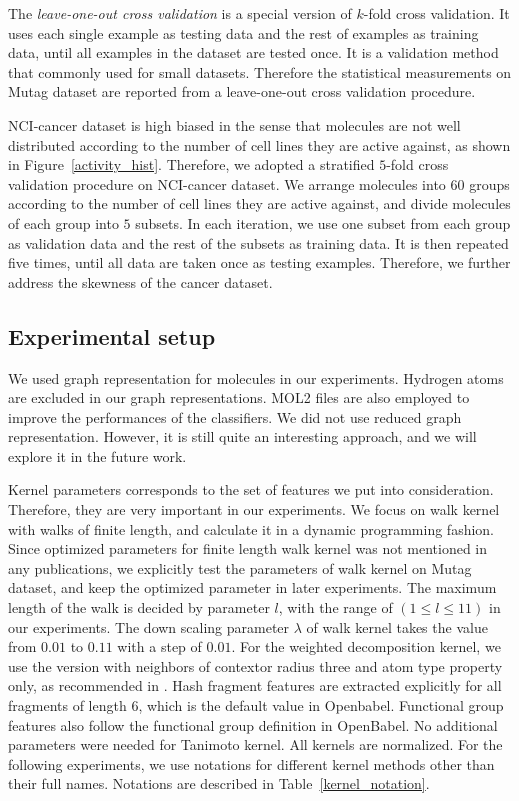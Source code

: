 \documentclass[english]{tktltiki}
\begin{document}
The {\em leave-one-out cross validation} is a special version of $k$-fold cross validation. It uses each single example as testing data and the rest of examples as training data, until all examples in the dataset are tested once. It is a validation method that commonly used for small datasets. Therefore the statistical measurements on Mutag dataset are reported from a leave-one-out cross validation procedure.

NCI-cancer dataset is high biased in the sense that molecules are not well distributed according to the number of cell lines they are active against, as shown in Figure~\ref{activity_hist}. Therefore, we adopted a stratified $5$-fold cross validation procedure on NCI-cancer dataset. We arrange molecules into $60$ groups according to the number of cell lines they are active against, and divide molecules of each group into $5$ subsets. In each iteration, we use one subset from each group as validation data and the rest of the subsets as training data. It is then repeated five times, until all data are taken once as testing examples. Therefore, we further address the skewness of the cancer dataset.


\subsection{Experimental setup}
\label{experimental_setup}

We used graph representation for molecules in our experiments. Hydrogen atoms are excluded in our graph representations. MOL2 files are also employed to improve the performances of the classifiers. We did not use reduced graph representation. However, it is still quite an interesting approach, and we will explore it in the future work.

Kernel parameters corresponds to the set of features we put into consideration. Therefore, they are very important  in our experiments. We focus on walk kernel with walks of finite length, and calculate it in a dynamic programming fashion. Since optimized parameters for finite length walk kernel was not mentioned in any publications, we explicitly test the parameters of walk kernel on Mutag dataset, and keep the optimized parameter in later experiments. The maximum length of the walk is decided by parameter $l$, with the range of $(1 \le l \le 11)$ in our experiments. The down scaling parameter $\lambda$ of walk kernel takes the value from $0.01$ to $0.11$  with a step of $0.01$. For the weighted decomposition kernel, we use the version with neighbors of contextor radius three and atom type property only, as recommended in \cite{ceroni07}. Hash fragment features are extracted explicitly for all fragments of length $6$, which is the default value in Openbabel. Functional group features also follow the functional group definition in OpenBabel. No additional parameters were needed for Tanimoto kernel. All kernels are normalized. For the following experiments, we use notations for different kernel methods other than their full names. Notations are described in Table~\ref{kernel_notation}.
\end{document}
